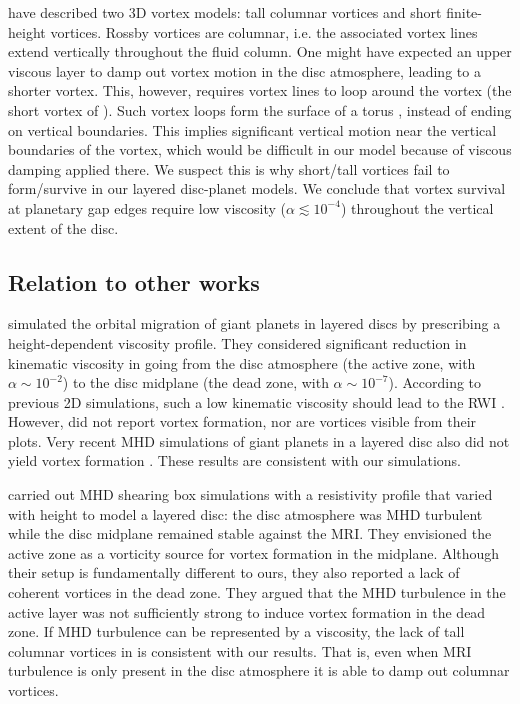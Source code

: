 \cite{barranco05} have described two 
3D vortex models: tall columnar vortices and short finite-height vortices. 
Rossby vortices are columnar, i.e. the associated vortex lines
extend vertically throughout the fluid column. One might have expected
an upper viscous layer to damp out vortex motion in the disc atmosphere, leading to a shorter
vortex. This, however, requires vortex lines to loop around the
vortex (the short vortex of \citeauthor{barranco05}). Such  
vortex loops form the surface of a torus \citep[see, for 
  example, Fig. 1 in][]{barranco05}, instead of ending on 
vertical boundaries. This implies significant vertical
motion near the vertical boundaries of the vortex, which would be  
difficult in our model because of viscous damping applied there. We
suspect this is why short/tall vortices fail to form/survive in our
layered disc-planet models. We conclude that vortex
survival at planetary gap edges require low viscosity
($\alpha\lesssim10^{-4}$) throughout the vertical extent of the
disc.     


\subsection{Relation to other works}
\cite{pierens10} simulated the orbital migration of giant planets in
layered discs by prescribing a height-dependent viscosity profile. They
considered significant reduction in kinematic viscosity in going from
the disc atmosphere (the active zone, with $\alpha\sim10^{-2}$) to the
disc midplane (the dead zone, with $\alpha\sim10^{-7}$). According to
previous 2D simulations, such a low kinematic viscosity should lead to
the RWI \citep{valborro06,valborro07}. However, \cite{pierens10}
did not report vortex formation, nor are vortices visible from their
plots.  Very recent MHD simulations of giant planets in a layered
  disc also did not yield vortex formation \citep{gressel13}. 
These results are consistent with our simulations. 

\cite{oishi09} carried out MHD shearing box simulations with 
a resistivity profile that varied with height to model a
layered disc: the disc atmosphere was MHD turbulent while the disc
midplane remained stable against the MRI. They envisioned the active
zone as a vorticity source for vortex formation in the midplane.  
Although their setup is fundamentally different to ours, they also
reported a lack of coherent vortices in the dead zone. They argued
that the MHD turbulence in the active layer was not sufficiently strong
to induce vortex formation in the dead zone. If MHD turbulence can be
represented by a viscosity, the lack of tall columnar vortices in
\cite{oishi09} is consistent with our results. That is,
even when MRI turbulence is only present in the disc atmosphere it is
able to damp out columnar vortices.     

